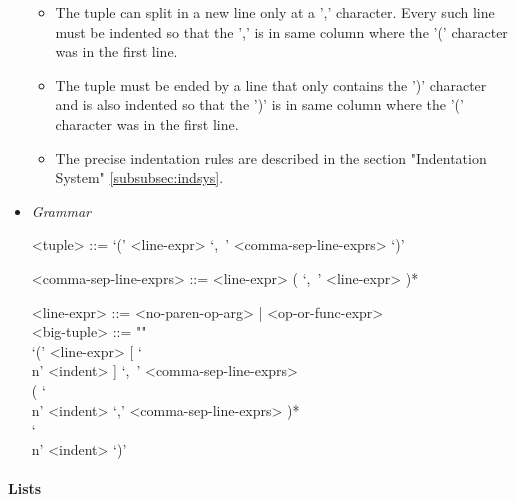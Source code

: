 \documentclass{article}
\begin{document}
\begin{itemize}
\begin{itemize}
\item
The tuple can split in a new line only at a ',' character. Every such line must
be indented so that the ',' is in same column where the '(' character was in
the first line.

\item
The tuple must be ended by a line that only contains the ')' character and is 
also indented so that the ')' is in same column where the '(' character was in
the first line.

\item
The precise indentation rules are described in the section
"Indentation System" \ref{subsubsec:indsys}.
\end{itemize}

\item \textit{Grammar}
\begin{grammar}
<tuple> ::= `(' <line-expr> `,\ ' <comma-sep-line-exprs> `)'

<comma-sep-line-exprs> ::= <line-expr> ( `,\ ' <line-expr> )*

<line-expr> ::= <no-paren-op-arg> | <op-or-func-expr> \\

<big-tuple> ::= ""\\
`(' <line-expr> [ `\\n' <indent> ] `,\ ' <comma-sep-line-exprs> \\
( `\\n' <indent> `,' <comma-sep-line-exprs> )* \\
`\\n' <indent> `)' \\

\end{grammar}

\end{itemize}

\paragraph{Lists}
\end{document}

